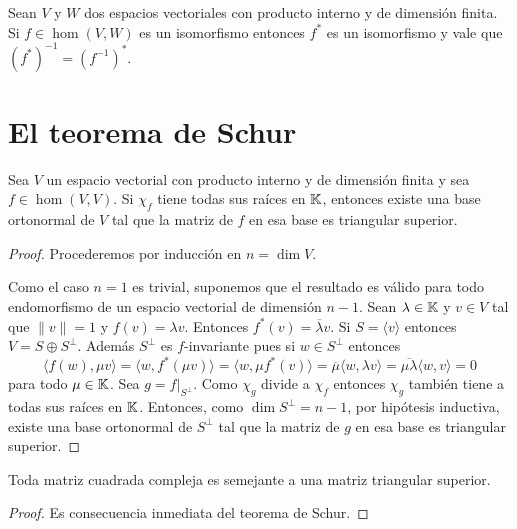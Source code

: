 \begin{xca}
	\label{xca:autoadjunta:iso}
	Sean $V$ y $W$ dos espacios vectoriales con producto interno y de dimensión
	finita. Si $f\in\hom(V,W)$ es un isomorfismo entonces $f^*$ es un
	isomorfismo y vale que $(f^*)^{-1}=(f^{-1})^*$.
\end{xca}

%	

\section{El teorema de Schur}

\begin{thm}[Schur]
	Sea $V$ un espacio vectorial con producto interno y de dimensión finita y
	sea $f\in\hom(V,V)$. Si $\chi_f$ tiene todas sus raíces en $\mathbb{K}$, entonces
	existe una base ortonormal de $V$ tal que la matriz de $f$ en esa base es
	triangular superior.

	\begin{proof}
		Procederemos por inducción en $n=\dim V$. 
        
        Como el caso $n=1$ es trivial, suponemos que el resultado es válido
        para todo endomorfismo de un espacio vectorial de dimensión $n-1$. Sean
        $\lambda\in\mathbb{K}$ y $v\in V$ tal que $\|v\|=1$ y $f(v)=\lambda v$. Entonces $f^*(v)=\overline{\lambda}v$. 
        Si $S=\langle v\rangle$ entonces $V=S\oplus
        S^\perp$.  Además $S^\perp$ es $f$-invariante pues si $w\in S^\perp$
        entonces
		\[
			\langle f(w),\mu v\rangle
			=\langle w,f^*(\mu v)\rangle
			=\langle w,\mu f^*(v)\rangle
			=\overline{\mu}\langle w,\lambda v\rangle
			=\overline{\mu\lambda}\langle w,v\rangle
			=0
		\]
		para todo $\mu\in\mathbb{K}$. Sea $g=f|_{S^\perp}$. Como $\chi_{g}$ divide a
		$\chi_f$ entonces $\chi_{g}$ también tiene a todas sus raíces en $\mathbb{K}$. 
		Entonces, como $\dim S^\perp=n-1$, por hipótesis inductiva, existe una
		base ortonormal de $S^\perp$ tal que la matriz de $g$ en esa base es
		triangular superior.
	\end{proof}
\end{thm}

\begin{cor}
	Toda matriz cuadrada compleja es semejante a una matriz triangular
	superior.

	\begin{proof}
		Es consecuencia inmediata del teorema de Schur.
	\end{proof}
\end{cor}

